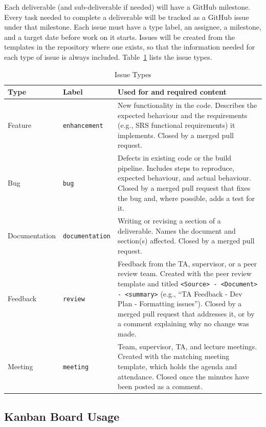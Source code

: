 \documentclass{article}
\begin{document}
Each deliverable (and sub-deliverable if needed) will have a GitHub milestone. Every task needed to complete a deliverable will be tracked as a GitHub issue under that milestone. Each issue must have a type label, an assignee, a milestone, and a target date before work on it starts. Issues will be created from the templates in the repository where one exists, so that the information needed for each type of issue is always included. Table~\ref{tab:issue-types} lists the issue types.

\begin{table}[H]
\caption{Issue Types} \label{tab:issue-types}
\begin{tabularx}{\textwidth}{p{2.4cm}p{2.7cm}>{\raggedright\arraybackslash}X}
\toprule
\textbf{Type} & \textbf{Label} & \textbf{Used for and required content}\\
\midrule
Feature & \texttt{enhancement} & New functionality in the code. Describes the expected behaviour and the requirements (e.g., SRS functional requirements) it implements. Closed by a merged pull request.\\
Bug & \texttt{bug} & Defects in existing code or the build pipeline. Includes steps to reproduce, expected behaviour, and actual behaviour. Closed by a merged pull request that fixes the bug and, where possible, adds a test for it.\\
Documentation & \texttt{documentation} & Writing or revising a section of a deliverable. Names the document and section(s) affected. Closed by a merged pull request.\\
Feedback & \texttt{review} & Feedback from the TA, supervisor, or a peer review team. Created with the peer review template and titled \texttt{<Source> - <Document> - <summary>} (e.g., ``TA Feedback - Dev Plan - Formatting issues''). Closed by a merged pull request that addresses it, or by a comment explaining why no change was made.\\
Meeting & \texttt{meeting} & Team, supervisor, TA, and lecture meetings. Created with the matching meeting template, which holds the agenda and attendance. Closed once the minutes have been posted as a comment.\\
\bottomrule
\end{tabularx}
\end{table}

\subsection{Kanban Board Usage} \label{sec:kanban}
\end{document}
